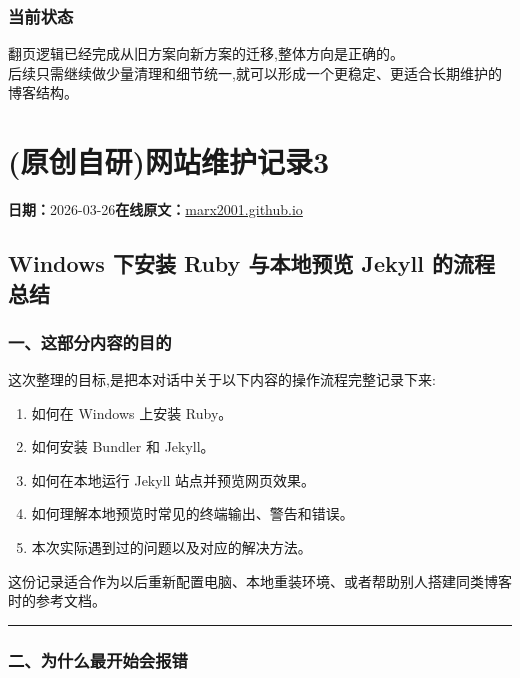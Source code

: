 \documentclass[lang=cn,scheme=chinese,color=blue,device=normal,toc=onecol,math=cm]{elegantbook}
\begin{document}
\subsubsection{当前状态}


翻页逻辑已经完成从旧方案向新方案的迁移,整体方向是正确的。\\ 后续只需继续做少量清理和细节统一,就可以形成一个更稳定、更适合长期维护的博客结构。\par



\section{(原创自研)网站维护记录3}
\begin{articlemeta}
\textbf{日期：}2026-03-26\hfill\textbf{在线原文：}\href{https://marx2001.github.io/sci-note\_posts/20260326deploy/}{marx2001.github.io}
\end{articlemeta}

\subsection{Windows 下安装 Ruby 与本地预览 Jekyll 的流程总结}


\subsubsection{一、这部分内容的目的}


这次整理的目标,是把本对话中关于以下内容的操作流程完整记录下来:\par


\begin{enumerate}
\item 如何在 Windows 上安装 Ruby。
\item 如何安装 Bundler 和 Jekyll。
\item 如何在本地运行 Jekyll 站点并预览网页效果。
\item 如何理解本地预览时常见的终端输出、警告和错误。
\item 本次实际遇到过的问题以及对应的解决方法。
\end{enumerate}


这份记录适合作为以后重新配置电脑、本地重装环境、或者帮助别人搭建同类博客时的参考文档。\par


\medskip\hrule\medskip


\subsubsection{二、为什么最开始会报错}
\end{document}
